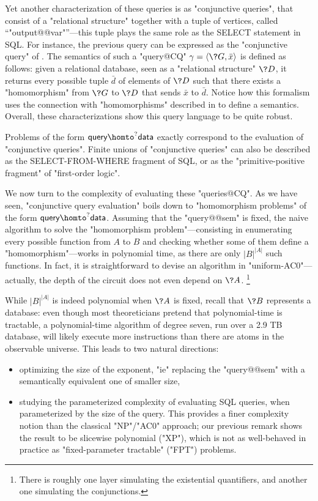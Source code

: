 Yet another characterization of these queries is as "conjunctive queries",
that consist of a "relational structure" together with a tuple of vertices, called ``"output@@var"''---this tuple
plays the same role as the \textsf{SELECT} statement in SQL.
For instance, the previous query can be expressed as the "conjunctive query"
of . The semantics of such a "query@CQ"
$\gamma = \tup{\?G, \bar x}$ is defined as follows:
given a relational database, seen as a "relational structure" $\?D$,
it returns every possible tuple $\bar d$ of elements of $\?D$ such that
there exists a "homomorphism" from $\?G$ to $\?D$ that sends $\bar x$ to $\bar d$.
Notice how this formalism uses the connection with "homomorphisms"
described in  to define a semantics.
Overall, these characterizations show this query language to be quite robust.

\begin{known}
	Problems of the form $\textsf{query} \homto^? \textsf{data}$
	exactly correspond to the evaluation of "conjunctive queries". 
	Finite unions of "conjunctive queries" can also be described as the
	\textsf{SELECT-FROM-WHERE} fragment of SQL, or as the "primitive-positive
	fragment" of "first-order logic".
\end{known}

We now turn to the complexity of evaluating these "queries@CQ".
As we have seen, "conjunctive query evaluation" boils down to
"homomorphism problems" of the form $\textsf{query} \homto^? \textsf{data}$.
Assuming that the "query@@sem" is fixed,
the naive algorithm to solve the "homomorphism problem"---consisting in enumerating
every possible function from $A$ to $B$ and checking whether some of them
define a "homomorphism"---works in polynomial time, as there are only $|B|^{|A|}$ such functions.
In fact, it is straightforward to devise an algorithm in "uniform-AC0"---actually, the depth
of the circuit does not even depend on $\?A$.%
\footnote{There is roughly one layer simulating the
existential quantifiers, and another one simulating the conjunctions.}

While $|B|^{|A|}$ is indeed polynomial when $\?A$ is fixed,
recall that $\?B$ represents a database:
even though most theoreticians pretend that polynomial-time is tractable,
a polynomial-time algorithm of degree seven,
run over a 2.9 TB database, will likely execute more instructions
than there are atoms in the observable universe.
This leads to two natural directions:
\begin{itemize}
	\item optimizing the size of the exponent, "ie"
		replacing the "query@@sem" with a semantically equivalent one of smaller size,
	\item studying the parameterized complexity of evaluating SQL queries, when parameterized by
		the size of the query. This provides a finer complexity notion than
		the classical "NP"/"AC0" approach; our previous remark shows the result to be
		slicewise polynomial ("XP"), which is not as well-behaved in practice as
		"fixed-parameter tractable" ("FPT") problems.
\end{itemize}

